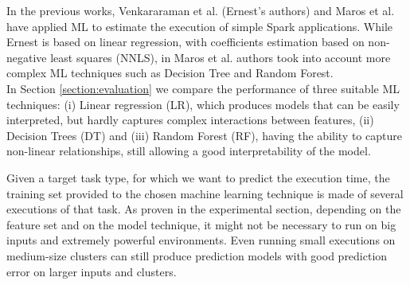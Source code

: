 \documentclass[a4paper, 10pt, conference]{ieeeconf}      %
\begin{document}
In the previous works, Venkararaman et al. \cite{ernest} (Ernest's authors)  and Maros et al.\cite{ARDAGNA2019} have applied ML to estimate the execution of simple Spark applications. While Ernest is based on linear regression, with coefficients estimation based on non-negative least squares (NNLS), in Maros et al. authors took into account more complex ML techniques such as Decision Tree and Random Forest.\\
In Section \ref{section:evaluation} we compare the performance of three suitable ML techniques: (i) Linear regression (LR), which produces models that can be easily interpreted, but hardly captures complex interactions between features, (ii) Decision Trees (DT) and (iii) Random Forest (RF), having the ability to capture non-linear relationships, still allowing a good interpretability of the model.

Given a target task type, for which we want to predict the execution time, the training set provided to the chosen machine learning technique is made of several executions of that task. 
As proven in the experimental section, depending on the feature set and on the model technique, it might not be necessary to run on big inputs and extremely powerful environments. Even running small executions on medium-size clusters can still produce prediction models with good prediction error on larger inputs and clusters.





\end{document}
